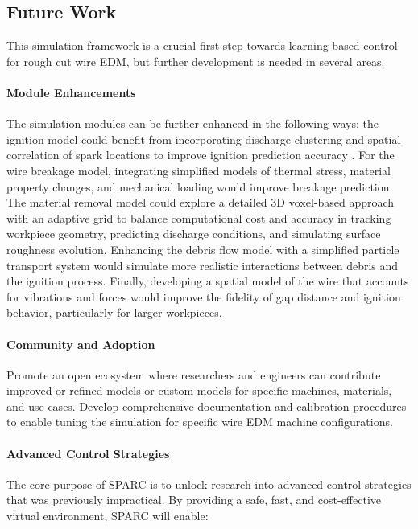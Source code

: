 \documentclass[5p,times,procedia]{elsarticle}
\begin{document}
\subsection{Future Work}

This simulation framework is a crucial first step towards learning-based control for rough cut wire EDM, but further development is needed in several areas.


\paragraph{Module Enhancements}
The simulation modules can be further enhanced in the following ways: the ignition model could benefit from incorporating discharge clustering and spatial correlation of spark locations to improve ignition prediction accuracy \cite{kronauer2022data}. For the wire breakage model, integrating simplified models of thermal stress, material property changes, and mechanical loading would improve breakage prediction. The material removal model could explore a detailed 3D voxel-based approach \cite{maderesteves2024} with an adaptive grid to balance computational cost and accuracy in tracking workpiece geometry, predicting discharge conditions, and simulating surface roughness evolution. Enhancing the debris flow model with a simplified particle transport system would simulate more realistic interactions between debris and the ignition process. Finally, developing a spatial model of the wire that accounts for vibrations and forces would improve the fidelity of gap distance and ignition behavior, particularly for larger workpieces.

\paragraph{Community and Adoption}
Promote an open ecosystem where researchers and engineers can contribute improved or refined models or custom models for specific machines, materials, and use cases. Develop comprehensive documentation and calibration procedures to enable tuning the simulation for specific wire EDM machine configurations.

\paragraph{Advanced Control Strategies}
The core purpose of SPARC is to unlock research into advanced control strategies that was previously impractical. By providing a safe, fast, and cost-effective virtual environment, SPARC will enable:
\end{document}
